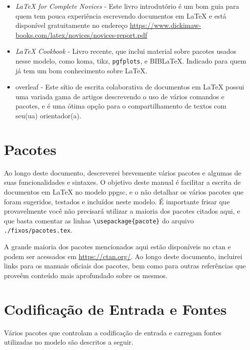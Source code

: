 \begin{itemize}
	\item \textit{\LaTeX{} for Complete Novices} \parencite{Talbot2012} - Este livro introdutório é um bom guia para quem tem pouca experiência escrevendo documentos em \LaTeX{} e está disponível gratuitamente no endereço \url{https://www.dickimaw-books.com/latex/novices/novices-report.pdf} 
	
	\item \textit{\LaTeX{} Cookbook} \parencite{Kottwitz2015} - Livro recente, que inclui material sobre pacotes usados nesse modelo, como \gls{koma}, \gls{tikz}, \texttt{pgfplots}, e BIB\LaTeX{}. Indicado para quem já tem um bom conhecimento sobre \LaTeX{}.
	
	\item \gls{overleaf} - Este sítio de escrita colaborativa de documentos em \LaTeX{} possui uma variada gama de artigos descrevendo o uso de vários comandos e pacotes, e é uma ótima opção para o compartilhamento de textos com seu(ua) orientador(a).
	
\end{itemize}

\section{Pacotes}

Ao longo deste documento, descreverei brevemente vários pacotes e algumas de suas funcionalidades e sintaxes. O objetivo deste manual é facilitar a escrita de documentos em \LaTeX{} no modelo \gls{ppgsc}, e o não detalhar os vários pacotes que foram sugeridos, testados e incluídos neste modelo. É importante frisar que provavelmente você não precisará utilizar a maioria dos pacotes citados aqui, e que basta comentar as linhas \texttt{\textbackslash usepackage\{pacote\}} do arquivo \texttt{./fixos/pacotes.tex}.

A grande maioria dos pacotes mencionados aqui estão disponíveis no \gls{ctan} e podem ser acessados em \url{https://ctan.org/}. Ao longo deste documento, incluirei links para os manuais oficiais dos pacotes, bem como para outras referências que proveêm conteúdo mais aprofundado sobre os mesmos.

\section{Codificação de Entrada e Fontes}

Vários pacotes que controlam a codificação de entrada e carregam fontes utilizadas no modelo são descritos a seguir.

